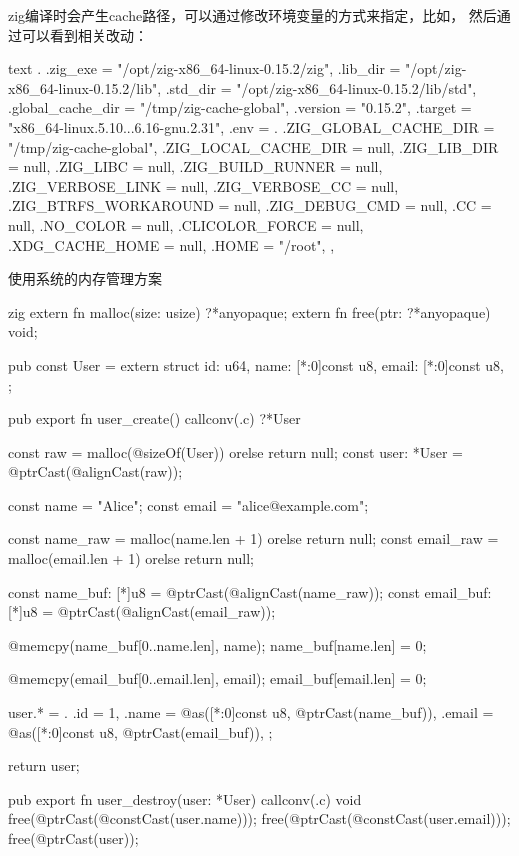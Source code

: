 zig编译时会产生cache路径，可以通过修改环境变量的方式来指定，比如，
然后通过可以看到相关改动：
\begin{code-block}{text}
.{
    .zig_exe = "/opt/zig-x86_64-linux-0.15.2/zig",
    .lib_dir = "/opt/zig-x86_64-linux-0.15.2/lib",
    .std_dir = "/opt/zig-x86_64-linux-0.15.2/lib/std",
    .global_cache_dir = "/tmp/zig-cache-global",
    .version = "0.15.2",
    .target = "x86_64-linux.5.10...6.16-gnu.2.31",
    .env = .{
        .ZIG_GLOBAL_CACHE_DIR = "/tmp/zig-cache-global",
        .ZIG_LOCAL_CACHE_DIR = null,
        .ZIG_LIB_DIR = null,
        .ZIG_LIBC = null,
        .ZIG_BUILD_RUNNER = null,
        .ZIG_VERBOSE_LINK = null,
        .ZIG_VERBOSE_CC = null,
        .ZIG_BTRFS_WORKAROUND = null,
        .ZIG_DEBUG_CMD = null,
        .CC = null,
        .NO_COLOR = null,
        .CLICOLOR_FORCE = null,
        .XDG_CACHE_HOME = null,
        .HOME = "/root",
    },
}
\end{code-block}

使用系统的内存管理方案
\begin{code-block}{zig}
extern fn malloc(size: usize) ?*anyopaque;
extern fn free(ptr: ?*anyopaque) void;

pub const User = extern struct {
    id: u64,
    name: [*:0]const u8,
    email: [*:0]const u8,
};

pub export fn user_create() callconv(.c) ?*User {
    const raw = malloc(@sizeOf(User)) orelse return null;
    const user: *User = @ptrCast(@alignCast(raw));

    const name = "Alice";
    const email = "alice@example.com";

    const name_raw = malloc(name.len + 1) orelse return null;
    const email_raw = malloc(email.len + 1) orelse return null;

    const name_buf: [*]u8 = @ptrCast(@alignCast(name_raw));
    const email_buf: [*]u8 = @ptrCast(@alignCast(email_raw));

    @memcpy(name_buf[0..name.len], name);
    name_buf[name.len] = 0;

    @memcpy(email_buf[0..email.len], email);
    email_buf[email.len] = 0;

    user.* = .{
        .id = 1,
        .name = @as([*:0]const u8, @ptrCast(name_buf)),
        .email = @as([*:0]const u8, @ptrCast(email_buf)),
    };

    return user;
}

pub export fn user_destroy(user: *User) callconv(.c) void {
    free(@ptrCast(@constCast(user.name)));
    free(@ptrCast(@constCast(user.email)));
    free(@ptrCast(user));
}
\end{code-block}
